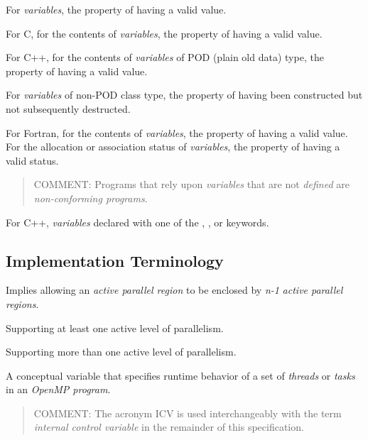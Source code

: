 \glossarydefstart
For \emph{variables}, the property of having a valid value.

For C, for the contents of \emph{variables}, the property of having a valid 
value.

For C++, for the contents of \emph{variables} of POD (plain old data) type, 
the property of having a valid value.

For \emph{variables} of non-POD class type, the property of having been 
constructed but not subsequently destructed.

For Fortran, for the contents of \emph{variables}, the property of having 
a valid value. For the allocation or association status of \emph{variables}, 
the property of having a valid status.

\begin{quote}
COMMENT: Programs that rely upon \emph{variables} that are not \emph{defined} 
are \emph{non-conforming programs}.
\end{quote}
\glossarydefend

\glossarydefstart
For C++, \emph{variables} declared with one of the , , 
or  keywords.
\glossarydefend





\subsection{Implementation Terminology}
\label{subsec:Implementation Terminology}
\glossarydefstart
Implies allowing an \emph{active parallel region} to be enclosed by \emph{n-1} 
\emph{active parallel regions}.
\glossarydefend

\glossarydefstart
Supporting at least one active level of parallelism.
\glossarydefend
\bigskip

\glossarydefstart
Supporting more than one active level of parallelism.
\glossarydefend
\bigskip

\glossarydefstart
A conceptual variable that specifies runtime behavior of a set of \emph{threads} 
or \emph{tasks} in an \emph{OpenMP program}.

\begin{quote}
COMMENT: The acronym ICV is used interchangeably with the term 
\emph{internal control variable} in the remainder of this specification.
\end{quote}
\glossarydefend

